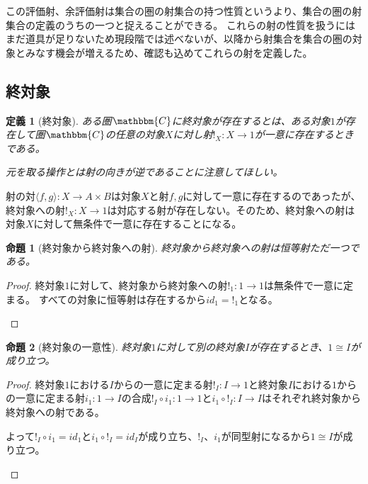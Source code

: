 \documentclass[dvipdfmx]{jsarticle}
\newcommand{\cat}[1]{\mathbbm{#1}}
\newcommand{\arrow}{\rightarrow}
\newcommand{\tuple}[1]{\langle #1\rangle}
\newcommand{\mor}[3]{#1:#2\arrow #3}
\newtheorem{proof}{証明}[section]
\newtheorem{prop}{命題}[section]
\newtheorem{define}{定義}[section]
\numberwithin{proof}{subsection}
\numberwithin{prop}{subsection}
\numberwithin{define}{subsection}
\begin{document}
	この評価射、余評価射は集合の圏の射集合の持つ性質というより、集合の圏の射集合の定義のうちの一つと捉えることができる。
	これらの射の性質を扱うにはまだ道具が足りないため現段階では述べないが、以降から射集合を集合の圏の対象とみなす機会が増えるため、確認も込めてこれらの射を定義した。
	\subsection{終対象}
	\begin{define}[終対象]
		ある圏$\cat{C}$に終対象が存在するとは、ある対象$1$が存在して圏$\cat{C}$の任意の対象$X$に対し射$\mor{!_X}{X}{1}$が一意に存在するときである。

		元を取る操作とは射の向きが逆であることに注意してほしい。
	\end{define}
	射の対$\mor{\tuple{f,g}}{X}{A\times B}$は対象$X$と射$f,g$に対して一意に存在するのであったが、終対象への射$\mor{!_X}{X}{1}$は対応する射が存在しない。そのため、終対象への射は対象$X$に対して無条件で一意に存在することになる。
	\begin{prop}[終対象から終対象への射]
		終対象から終対象への射は恒等射ただ一つである。
	\end{prop}
	\begin{proof}
		終対象$1$に対して、終対象から終対象への射$\mor{!_1}{1}{1}$は無条件で一意に定まる。
		すべての対象に恒等射は存在するから$id_1=!_1$となる。
		\begin{center}
		\end{center}
	\end{proof}

	\begin{prop}[終対象の一意性]
		終対象$1$に対して別の終対象$I$が存在するとき、$1\cong I$が成り立つ。
	\end{prop}
	\begin{proof}
		終対象$1$における$I$からの一意に定まる射$\mor{!_I}{I}{1}$と終対象$I$における$1$からの一意に定まる射$\mor{i_1}{1}{I}$の合成$\mor{!_I\circ i_1}{1}{1}$と$\mor{i_1\circ!_I}{I}{I}$はそれぞれ終対象から終対象への射である。

		よって$!_I\circ i_1=id_1$と$i_1\circ!_I=id_I$が成り立ち、$!_I$、$i_1$が同型射になるから$1\cong I$が成り立つ。
		\begin{center}
		\end{center}
	\end{proof}
\end{document}
